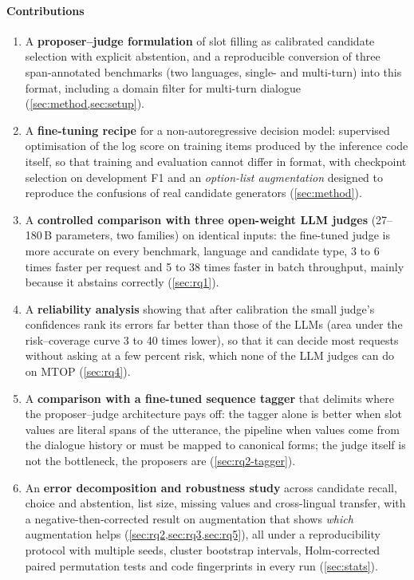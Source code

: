 \paragraph{Contributions}
\begin{enumerate}
  \item A \textbf{proposer--judge formulation} of slot filling as calibrated candidate selection with explicit abstention, and a reproducible conversion of three span-annotated benchmarks (two languages, single- and multi-turn) into this format, including a domain filter for multi-turn dialogue (\cref{sec:method,sec:setup}).
  \item A \textbf{fine-tuning recipe} for a non-autoregressive decision model: supervised optimisation of the log score on training items produced by the inference code itself, so that training and evaluation cannot differ in format, with checkpoint selection on development F1 and an \emph{option-list augmentation} designed to reproduce the confusions of real candidate generators (\cref{sec:method}).
  \item A \textbf{controlled comparison with three open-weight LLM judges} (27--180\,B parameters, two families) on identical inputs: the fine-tuned judge is more accurate on every benchmark, language and candidate type, 3 to 6 times faster per request and 5 to 38 times faster in batch throughput, mainly because it abstains correctly (\cref{sec:rq1}).
  \item A \textbf{reliability analysis} showing that after calibration the small judge's confidences rank its errors far better than those of the LLMs (area under the risk--coverage curve 3 to 40 times lower), so that it can decide most requests without asking at a few percent risk, which none of the LLM judges can do on MTOP (\cref{sec:rq4}).
  \item A \textbf{comparison with a fine-tuned sequence tagger} that delimits where the proposer--judge architecture pays off: the tagger alone is better when slot values are literal spans of the utterance, the pipeline when values come from the dialogue history or must be mapped to canonical forms; the judge itself is not the bottleneck, the proposers are (\cref{sec:rq2-tagger}).
  \item An \textbf{error decomposition and robustness study} across candidate recall, choice and abstention, list size, missing values and cross-lingual transfer, with a negative-then-corrected result on augmentation that shows \emph{which} augmentation helps (\cref{sec:rq2,sec:rq3,sec:rq5}), all under a reproducibility protocol with multiple seeds, cluster bootstrap intervals, Holm-corrected paired permutation tests and code fingerprints in every run (\cref{sec:stats}).
\end{enumerate}

